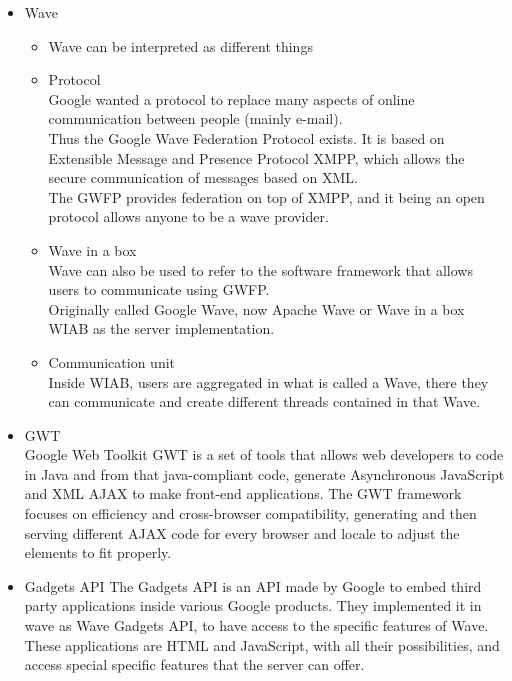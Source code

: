 \begin{itemize}
  \item Wave

  \begin{itemize}

    \item Wave can be interpreted as different things

    \item Protocol\\
    Google wanted a protocol to replace many aspects of online communication between people (mainly e-mail).\\
    Thus the Google Wave Federation Protocol exists. It is based on Extensible Message and Presence Protocol XMPP, which allows the secure communication of messages based on XML.\\
    The GWFP provides federation on top of XMPP, and it being an open protocol allows anyone to be a wave provider.
    
    \item Wave in a box\\
    Wave can also be used to refer to the software framework that allows users to communicate using GWFP.\\
    Originally called Google Wave, now Apache Wave or Wave in a box WIAB as the server implementation.

    \item Communication unit\\
    Inside WIAB, users are aggregated in what is called a Wave, there they can communicate and create different threads contained in that Wave.\\

  \end{itemize}

  \item GWT\\
  Google Web Toolkit GWT is a set of tools that allows web developers to code in Java and from that java-compliant code, generate Asynchronous JavaScript and XML AJAX to make front-end applications. The GWT framework focuses on efficiency and cross-browser compatibility, generating and then serving different AJAX code for every browser and locale to adjust the elements to fit properly.

  \item Gadgets API
  The Gadgets API is an API made by Google to embed third party applications inside various Google products. They implemented it in wave as Wave Gadgets API, to have access to the specific features of Wave. These applications are HTML and JavaScript, with all their possibilities, and access special specific features that the server can offer.


\end{itemize}
